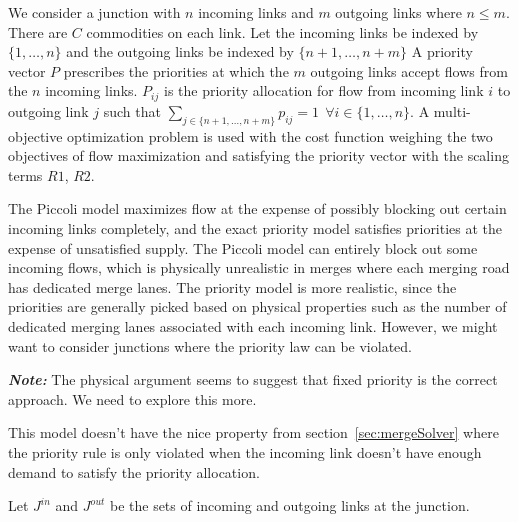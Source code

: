 We consider a junction with $n$ incoming links and $m$ outgoing links where $n \leq{m}$. There are $C$ commodities on each link. Let the incoming links be indexed by $\{1, \dots, n\}$ and the outgoing links be indexed by $\{n+1, \dots, n+m\}$ A priority vector $P$ prescribes the priorities at which the $m$ outgoing links accept flows from the $n$ incoming links. $P_{ij}$ is the priority allocation for flow from incoming link $i$ to outgoing link $j$ such that $\sum_{j\in \{n+1, \dots, n+m\}} p_{ij} = 1 \ \ \forall i\in \{1, \dots, n\}$. A multi-objective optimization problem is used with the cost function weighing the two objectives of flow maximization and satisfying the priority vector with the scaling terms $R1$, $R2$.

\begin{remark}
The Piccoli model maximizes flow at the expense of possibly blocking out certain incoming links completely, and the exact priority model satisfies priorities at the expense of unsatisfied supply. The Piccoli model can entirely block out some incoming flows, which is physically unrealistic in merges where each merging road has dedicated merge lanes. The priority model is more realistic, since the priorities are generally picked based on physical properties such as the number of dedicated merging lanes associated with each incoming link. However, we might want to consider junctions where the priority law can be violated. 
\end{remark}

\textit{\textbf{Note:}} The physical argument seems to suggest that fixed priority is the correct approach. We need to explore this more. \\

\begin{remark}
This model doesn't have the nice property from section~\ref{sec:mergeSolver} where the priority rule is only violated when the incoming link doesn't have enough demand to satisfy the priority allocation. 
\end{remark}


Let $J^{in}$ and $J^{out}$ be the sets of incoming and outgoing links at the junction.

